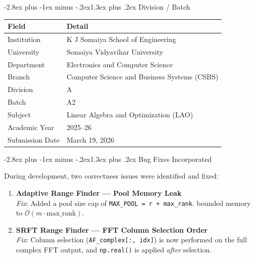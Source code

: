 \documentclass[12pt,a4paper]{article}
\makeatletter
\renewcommand{\section}{\@startsection{section}{1}{\z@}
  {-2.8ex plus -1ex minus -.2ex}{1.3ex plus .2ex}
  {\large\bfseries\color{deepblue}}}
\makeatother
\begin{document}
\section{Division / Batch}

\begin{center}
\begin{tabular}{ll}
\toprule
\textbf{Field} & \textbf{Detail} \\
\midrule
Institution     & K J Somaiya School of Engineering \\
University      & Somaiya Vidyavihar University \\
Department      & Electronics and Computer Science \\
Branch          & Computer Science and Business Systems (CSBS) \\
Division        & A \\
Batch           & A2 \\
Subject         & Linear Algebra and Optimization (LAO) \\
Academic Year   & 2025--26 \\
Submission Date & March 19, 2026 \\
\bottomrule
\end{tabular}
\end{center}

\section{Bug Fixes Incorporated}

During development, two correctness issues were identified and fixed:

\begin{enumerate}[leftmargin=1.8em, itemsep=4pt]
  \item \textbf{Adaptive Range Finder --- Pool Memory Leak}\\
    \textit{Fix}: Added a pool size cap of \texttt{MAX\_POOL = r + max\_rank}. bounded memory to $\mathcal{O}(m \cdot \text{max\_rank})$.

  \item \textbf{SRFT Range Finder --- FFT Column Selection Order}\\
    \textit{Fix}: Column selection (\texttt{AF\_complex[:, idx]}) is now performed on the
    full complex FFT output, and \texttt{np.real()} is applied \emph{after} selection.
\end{enumerate}
\end{document}
